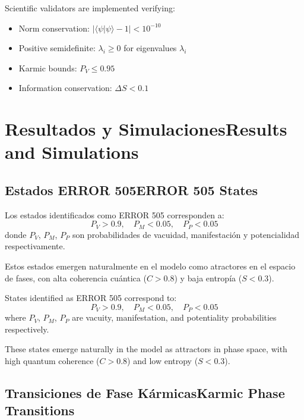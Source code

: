\documentclass[12pt,a4paper]{article}
\newcommand{\es}[1]{\foreignlanguage{spanish}{#1}}
\newcommand{\en}[1]{\foreignlanguage{english}{#1}}
\begin{document}
\begin{otherlanguage}{english}
Scientific validators are implemented verifying:
\begin{itemize}
\item Norm conservation: $|\langle\psi|\psi\rangle - 1| < 10^{-10}$
\item Positive semidefinite: $\lambda_i \geq 0$ for eigenvalues $\lambda_i$
\item Karmic bounds: $P_V \leq 0.95$
\item Information conservation: $\Delta S < 0.1$
\end{itemize}
\end{otherlanguage}

\section{\es{Resultados y Simulaciones}\en{Results and Simulations}}

\subsection{\es{Estados ERROR 505}\en{ERROR 505 States}}

\begin{otherlanguage}{spanish}
Los estados identificados como ERROR 505 corresponden a:
\begin{equation}
P_V > 0.9,\quad P_M < 0.05,\quad P_P < 0.05
\end{equation}
donde $P_V$, $P_M$, $P_P$ son probabilidades de vacuidad, manifestación y potencialidad respectivamente.

Estos estados emergen naturalmente en el modelo como atractores en el espacio de fases, con alta coherencia cuántica ($C > 0.8$) y baja entropía ($S < 0.3$).
\end{otherlanguage}

\begin{otherlanguage}{english}
States identified as ERROR 505 correspond to:
\begin{equation}
P_V > 0.9,\quad P_M < 0.05,\quad P_P < 0.05
\end{equation}
where $P_V$, $P_M$, $P_P$ are vacuity, manifestation, and potentiality probabilities respectively.

These states emerge naturally in the model as attractors in phase space, with high quantum coherence ($C > 0.8$) and low entropy ($S < 0.3$).
\end{otherlanguage}

\subsection{\es{Transiciones de Fase Kármicas}\en{Karmic Phase Transitions}}
\end{document}
